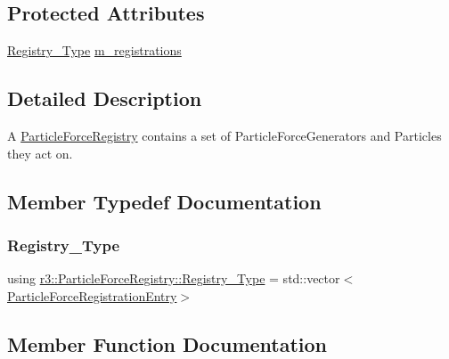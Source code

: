 \subsection*{Protected Attributes}
\begin{DoxyCompactItemize}
\item 
\mbox{\hyperlink{classr3_1_1_particle_force_registry_ae769e654dbf539cf09c514e47768498c}{Registry\+\_\+\+Type}} \mbox{\hyperlink{classr3_1_1_particle_force_registry_ac0130d368fb6f3f8894bc83b615e193f}{m\+\_\+registrations}}
\end{DoxyCompactItemize}


\subsection{Detailed Description}
A \mbox{\hyperlink{classr3_1_1_particle_force_registry}{Particle\+Force\+Registry}} contains a set of Particle\+Force\+Generators and Particles they act on. 

\subsection{Member Typedef Documentation}
\mbox{\label{classr3_1_1_particle_force_registry_ae769e654dbf539cf09c514e47768498c}} 
\subsubsection{\texorpdfstring{Registry\+\_\+\+Type}{Registry\_Type}}
{\footnotesize\ttfamily using \mbox{\hyperlink{classr3_1_1_particle_force_registry_ae769e654dbf539cf09c514e47768498c}{r3\+::\+Particle\+Force\+Registry\+::\+Registry\+\_\+\+Type}} =  std\+::vector$<$\mbox{\hyperlink{structr3_1_1_particle_force_registry_1_1_particle_force_registration_entry}{Particle\+Force\+Registration\+Entry}}$>$}



\subsection{Member Function Documentation}
\mbox{\label{classr3_1_1_particle_force_registry_a11cb053992645af9af2ccd5f98783cae}} 
